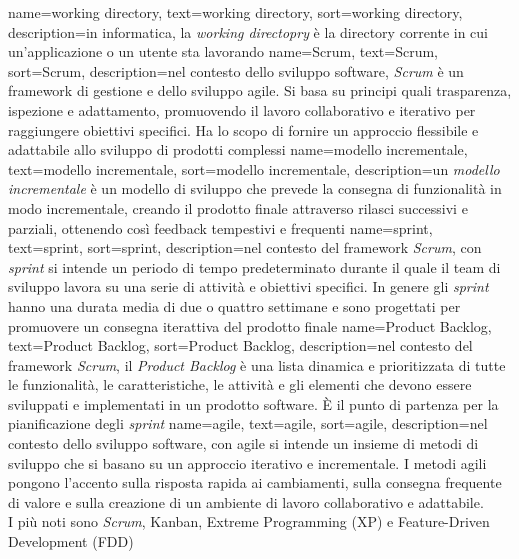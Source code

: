 {
    name={working directory},
    text=working directory,
    sort=working directory,
    description={in informatica, la \textit{working directopry} è la directory corrente in cui un'applicazione o un utente sta lavorando}
}
{
    name={Scrum},
    text=Scrum,
    sort=Scrum,
    description={nel contesto dello sviluppo software, \textit{Scrum} è un framework di gestione e dello sviluppo agile. Si basa su principi quali trasparenza, ispezione 
    e adattamento, promuovendo il lavoro collaborativo e iterativo per raggiungere obiettivi specifici. Ha lo scopo di fornire un approccio 
    flessibile e adattabile allo sviluppo di prodotti complessi}
}
{
    name={modello incrementale},
    text=modello incrementale,
    sort=modello incrementale,
    description={un \textit{modello incrementale} è un modello di sviluppo che prevede la consegna di funzionalità in modo incrementale, creando 
    il prodotto finale attraverso rilasci successivi e parziali, ottenendo così feedback tempestivi e frequenti}
}
{
    name={sprint},
    text=sprint,
    sort=sprint,
    description={nel contesto del framework \textit{Scrum}, con \textit{sprint} si intende un periodo di tempo predeterminato durante il quale il team di sviluppo lavora su una serie di attività e obiettivi specifici. In genere 
    gli \textit{sprint} hanno una durata media di due o quattro settimane e sono progettati per promuovere un consegna iterattiva 
    del prodotto finale}
}
{
    name={Product Backlog},
    text=Product Backlog,
    sort=Product Backlog,
    description={nel contesto del framework \textit{Scrum}, il \textit{Product Backlog} è una lista dinamica e prioritizzata di tutte le funzionalità, le caratteristiche, le attività e gli elementi che devono essere sviluppati e implementati in un prodotto software. È
    il punto di partenza per la pianificazione degli \textit{sprint}}
}
{
    name={agile},
    text=agile,
    sort=agile,
    description={nel contesto dello sviluppo software, con agile si intende un insieme di metodi di sviluppo che si basano su un approccio iterativo e incrementale. 
    I metodi agili pongono l'accento sulla risposta rapida ai cambiamenti, sulla consegna frequente di valore e sulla creazione di un ambiente di lavoro collaborativo e adattabile.
    \\I più noti sono \textit{Scrum}, Kanban, Extreme Programming (XP) e Feature-Driven Development (FDD)}
}
